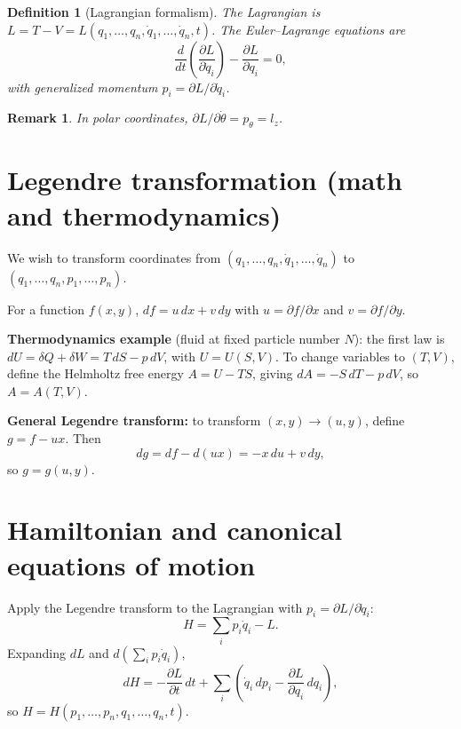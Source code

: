 \documentclass[11pt]{article}
\newtheorem{definition}{Definition}
\newtheorem{remark}{Remark}
\begin{document}
\begin{definition}[Lagrangian formalism]
The Lagrangian is $L = T - V = L(q_1,\ldots,q_n,\dot{q}_1,\ldots,\dot{q}_n,t)$.
The Euler--Lagrange equations are
\begin{equation}
  \frac{d}{dt}\left(\frac{\partial L}{\partial \dot{q}_i}\right)
  - \frac{\partial L}{\partial q_i} = 0,
\end{equation}
with generalized momentum $p_i = \partial L/\partial \dot{q}_i$.
\end{definition}

\begin{remark}
In polar coordinates, $\partial L/\partial \dot{\theta} = p_\theta = l_z$.
\end{remark}

\section{Legendre transformation (math and thermodynamics)}

We wish to transform coordinates from $(q_1,\ldots,q_n,\dot{q}_1,\ldots,\dot{q}_n)$ to
$(q_1,\ldots,q_n,p_1,\ldots,p_n)$.

For a function $f(x,y)$, $df = u\,dx + v\,dy$ with $u = \partial f/\partial x$ and
$v = \partial f/\partial y$.

\textbf{Thermodynamics example} (fluid at fixed particle number $N$): the first law is
$dU = \delta Q + \delta W = T\,dS - p\,dV$, with $U = U(S,V)$. To change variables to
$(T,V)$, define the Helmholtz free energy $A = U - TS$, giving
$dA = -S\,dT - p\,dV$, so $A = A(T,V)$.

\textbf{General Legendre transform:} to transform $(x,y) \to (u,y)$, define $g = f - ux$.
Then
\begin{equation}
  dg = df - d(ux) = -x\,du + v\,dy,
\end{equation}
so $g = g(u,y)$.

\section{Hamiltonian and canonical equations of motion}

Apply the Legendre transform to the Lagrangian with $p_i = \partial L/\partial \dot{q}_i$:
\begin{equation}
  H = \sum_i p_i\dot{q}_i - L.
\end{equation}
Expanding $dL$ and $d\!\left(\sum_i p_i\dot{q}_i\right)$,
\begin{equation}
  dH = -\frac{\partial L}{\partial t}\,dt
  + \sum_i\left(\dot{q}_i\,dp_i - \frac{\partial L}{\partial q_i}\,dq_i\right),
\end{equation}
so $H = H(p_1,\ldots,p_n,q_1,\ldots,q_n,t)$.
\end{document}
